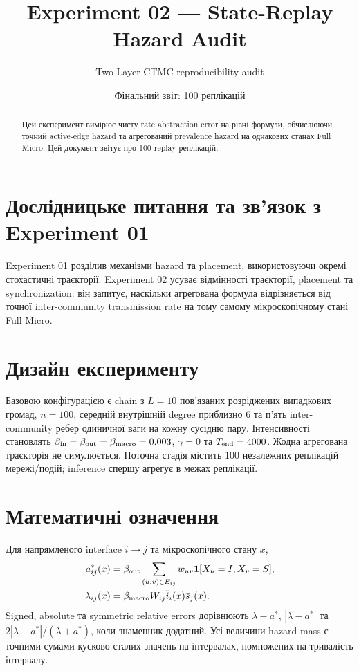 \documentclass[11pt]{article}
\title{Experiment 02 --- State-Replay Hazard Audit}
\author{Two-Layer CTMC reproducibility audit}
\date{Фінальний звіт: 100 реплікацій}
\begin{document}
\maketitle
\begin{abstract}
Цей експеримент вимірює чисту rate abstraction error на рівні формули, обчислюючи точний active-edge hazard та агрегований prevalence hazard на однакових станах Full Micro. Цей документ звітує про 100 replay-реплікацій.
\end{abstract}

\section{Дослідницьке питання та зв'язок з Experiment 01}
Experiment 01 розділив механізми hazard та placement, використовуючи окремі стохастичні траєкторії. Experiment 02 усуває відмінності траєкторії, placement та synchronization: він запитує, наскільки агрегована формула відрізняється від точної inter-community transmission rate на тому самому мікроскопічному стані Full Micro.

\section{Дизайн експерименту}
Базовою конфігурацією є chain з $L=10$ пов'язаних розріджених випадкових громад, $n=100$, середній внутрішній degree приблизно 6 та п'ять inter-community ребер одиничної ваги на кожну сусідню пару. Інтенсивності становлять $\beta_{\rm in}=\beta_{\rm out}=\beta_{\rm macro}=0.003$, $\gamma=0$ та $T_{\rm end}=4000$. Жодна агрегована траєкторія не симулюється. Поточна стадія містить 100 незалежних реплікацій мережі/подій; inference спершу агрегує в межах реплікації.

\section{Математичні означення}
Для напрямленого interface $i\to j$ та мікроскопічного стану $x$,
\begin{align}
a^*_{ij}(x)&=\beta_{\rm out}\sum_{(u,v)\in E_{ij}}w_{uv}\mathbf{1}[X_u=I,X_v=S],\\
\lambda_{ij}(x)&=\beta_{\rm macro}W_{ij}\bar i_i(x)\bar s_j(x).
\end{align}
Signed, absolute та symmetric relative errors дорівнюють $\lambda-a^*$, $|\lambda-a^*|$ та $2|\lambda-a^*|/(\lambda+a^*)$, коли знаменник додатний. Усі величини hazard mass є точними сумами кусково-сталих значень на інтервалах, помножених на тривалість інтервалу.
\end{document}
